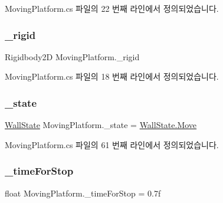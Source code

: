 Moving\+Platform.\+cs 파일의 22 번째 라인에서 정의되었습니다.

\mbox{\label{class_moving_platform_a420854da980550fe82c4f82f46ecd41e}} 
\subsubsection{\texorpdfstring{\_rigid}{\_rigid}}
{\footnotesize\ttfamily Rigidbody2D Moving\+Platform.\+\_\+rigid\hspace{0.3cm}{\ttfamily [private]}}



Moving\+Platform.\+cs 파일의 18 번째 라인에서 정의되었습니다.

\mbox{\label{class_moving_platform_abd03a1d4800fd5fa8ab4ef8ce5a688db}} 
\subsubsection{\texorpdfstring{\_state}{\_state}}
{\footnotesize\ttfamily \mbox{\hyperlink{class_moving_platform_ac47e764b71989317aab0bad26d82a901}{Wall\+State}} Moving\+Platform.\+\_\+state = \mbox{\hyperlink{class_moving_platform_ac47e764b71989317aab0bad26d82a901a6bc362dbf494c61ea117fe3c71ca48a5}{Wall\+State.\+Move}}\hspace{0.3cm}{\ttfamily [private]}}



Moving\+Platform.\+cs 파일의 61 번째 라인에서 정의되었습니다.

\mbox{\label{class_moving_platform_a69791dc347a05d5513e82cd445640cf4}} 
\subsubsection{\texorpdfstring{\_timeForStop}{\_timeForStop}}
{\footnotesize\ttfamily float Moving\+Platform.\+\_\+time\+For\+Stop = 0.\+7f\hspace{0.3cm}{\ttfamily [private]}}



